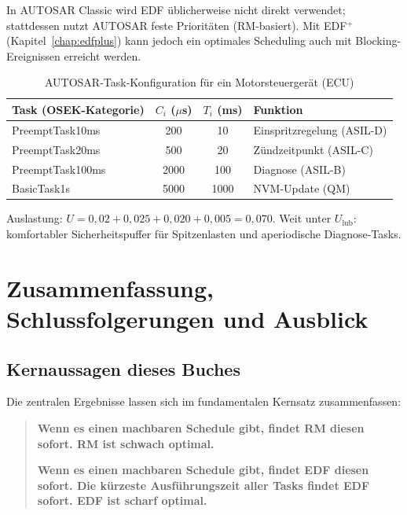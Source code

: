 ﻿\documentclass[a4paper,12pt]{report}
\theoremstyle{definition}
\begin{document}
In AUTOSAR Classic wird EDF üblicherweise nicht direkt verwendet; stattdessen
nutzt AUTOSAR feste Prioritäten (RM-basiert). Mit EDF$^+$ (Kapitel~\ref{chap:edfplus})
kann jedoch ein optimales Scheduling auch mit Blocking-Ereignissen erreicht werden.

\begin{table}[H]
	\centering
	\caption{AUTOSAR-Task-Konfiguration für ein Motorsteuergerät (ECU)}
	\begin{tabular}{lccl}
		\toprule
		\textbf{Task (OSEK-Kategorie)} & $C_i$ ($\mu$s) & $T_i$ (ms) & \textbf{Funktion} \\
		\midrule
		PreemptTask10ms & 200  & 10   & Einspritzregelung (ASIL-D) \\
		PreemptTask20ms & 500  & 20   & Zündzeitpunkt (ASIL-C) \\
		PreemptTask100ms & 2000 & 100  & Diagnose (ASIL-B) \\
		BasicTask1s     & 5000 & 1000 & NVM-Update (QM) \\
		\bottomrule
	\end{tabular}
\end{table}

Auslastung: $U = 0{,}02 + 0{,}025 + 0{,}020 + 0{,}005 = 0{,}070$. Weit unter $U_{\text{lub}}$:
komfortabler Sicherheitspuffer für Spitzenlasten und aperiodische Diagnose-Tasks.

\chapter{Zusammenfassung, Schlussfolgerungen und Ausblick}
\label{chap:zusammenfassung}

\section{Kernaussagen dieses Buches}

Die zentralen Ergebnisse lassen sich im fundamentalen Kernsatz zusammenfassen:

\begin{quote}
\textbf{Wenn es einen machbaren Schedule gibt, findet RM diesen sofort. RM ist schwach optimal.}

\textbf{Wenn es einen machbaren Schedule gibt, findet EDF diesen sofort.
Die kürzeste Ausführungszeit aller Tasks findet EDF sofort. EDF ist scharf optimal.}
\end{quote}
\end{document}
